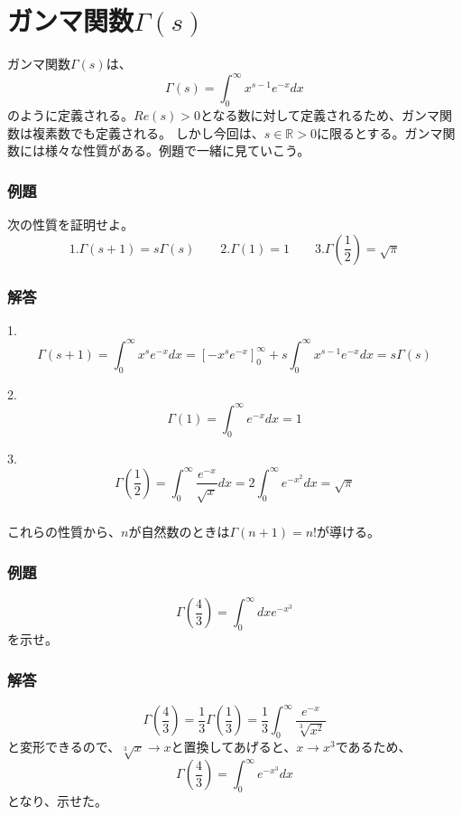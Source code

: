 \documentclass[a4j,dvipdfmx]{jsarticle}
\begin{document}
\section{ガンマ関数$\Gamma(s)$}
ガンマ関数$\Gamma(s)$は、
\begin{equation*}
    \Gamma(s)=\int_0^\infty x^{s-1}e^{-x}dx
\end{equation*}
のように定義される。$Re(s)>0$となる数に対して定義されるため、ガンマ関数は複素数でも定義される。
しかし今回は、$s\in \mathbb{R}>0$に限るとする。ガンマ関数には様々な性質がある。例題で一緒に見ていこう。
\subsubsection*{例題}
次の性質を証明せよ。
\begin{equation*}
    1.\Gamma(s+1)=s\Gamma(s)\qquad 2.\Gamma(1)=1\qquad 3.\Gamma(\frac{1}{2})=\sqrt{\pi}
\end{equation*}
\subsubsection*{解答}
1.
\begin{equation*}
\Gamma(s+1)=\int_0^\infty x^s e^{-x}dx =\left[-x^s e^{-x}\right]_0^\infty+s\int_0^\infty x^{s-1}e^{-x}dx=s\Gamma(s)  
\end{equation*}

2.
\begin{equation*}
    \Gamma(1)=\int_0^\infty e^{-x}dx=1
\end{equation*}

3.
\begin{equation*}
    \Gamma\left(\frac{1}{2}\right)=\int_0^\infty \frac{e^{-x}}{\sqrt{x}}dx=2\int_0^\infty e^{-x^2}dx=\sqrt{\pi}
\end{equation*}
\subsubsection*{}
これらの性質から、$n$が自然数のときは$\Gamma(n+1)=n!$が導ける。
\subsubsection*{例題}
\begin{equation*}
    \Gamma\left(\frac{4}{3}\right)=\int_0^\infty dx e^{-x^3}
\end{equation*}
を示せ。
\subsubsection*{解答}
\begin{equation*}
    \Gamma\left(\frac{4}{3}\right)=\frac{1}{3}\Gamma\left(\frac{1}{3}\right)=\frac{1}{3}\int_0^\infty \frac{e^{-x}}{\sqrt[3]{x^2}}
\end{equation*}
と変形できるので、$\sqrt[3]{x}\to x$と置換してあげると、$x\to x^3$であるため、
\begin{equation*}
    \Gamma\left(\frac{4}{3}\right)=\int_0^\infty e^{-x^3}dx
\end{equation*}
となり、示せた。
\end{document}
